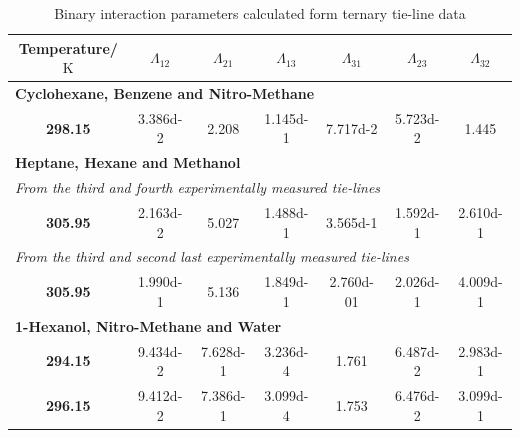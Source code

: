 \begin{landscape}
\vspace*{\fill}
\begin{table}[h]
\caption{Binary interaction parameters calculated form ternary tie-line data}
\centering
\begin{tabular}{ccccccc}
\toprule
\textbf{Temperature}/$\mathrm{K}$&$\Lambda_{12}$&$\Lambda_{21}$&$\Lambda_{13}$&$\Lambda_{31}$&$\Lambda_{23}$&$\Lambda_{32}$\\
\midrule
\multicolumn{7}{l}{\textbf{Cyclohexane, Benzene and Nitro-Methane}}\\
\midrule
\textbf{ 298.15 } & \num{3.386d-2} & \num{2.208} & \num{1.145d-1} & \num{7.717d-2} & \num{5.723d-2} & \num{1.445}\\
\midrule
\multicolumn{7}{l}{\textbf{Heptane, Hexane and Methanol}}\\
\midrule
\multicolumn{7}{l}{\emph{From the third and fourth experimentally measured tie-lines}}\\
\textbf{ 305.95 } & \num{2.163d-2} & \num{5.027} & \num{1.488d-1} & \num{3.565d-1} & \num{1.592d-1} & \num{2.610d-1}\\
\multicolumn{7}{l}{\emph{From the third and second last experimentally measured tie-lines}}\\
\textbf{ 305.95 } & \num{1.990d-1} & \num{5.136} & \num{1.849d-1} & \num{2.760d-01} & \num{2.026d-1} & \num{4.009d-1}\\
\midrule
\multicolumn{7}{l}{\textbf{1-Hexanol, Nitro-Methane and Water}}\\
\midrule
\textbf{ 294.15 } & \num{9.434d-2} & \num{7.628d-1} & \num{3.236d-4} & \num{1.761} & \num{6.487d-2} & \num{2.983d-1}\\
\textbf{ 296.15 } & \num{9.412d-2} & \num{7.386d-1} & \num{3.099d-4} & \num{1.753} & \num{6.476d-2} & \num{3.099d-1}\\
\bottomrule
\end{tabular}\\
\label{TernaryParameterResultsTable}
\end{table}
\vspace*{\fill}
\end{landscape}

